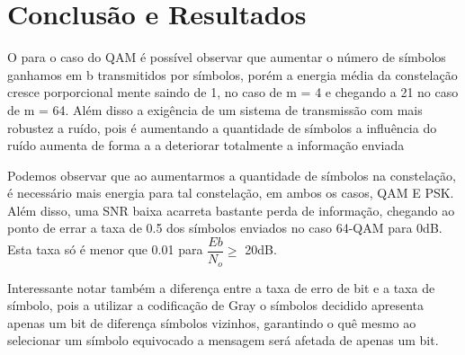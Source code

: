 \documentclass[a4paper, 12pt]{article}
\begin{document}





\clearpage

\clearpage

\clearpage

\clearpage

\clearpage

\section{Conclusão e Resultados}

O para o caso do QAM é possível observar que aumentar o número de símbolos ganhamos em b transmitidos por símbolos, porém a energia média da constelação cresce porporcional mente saindo de 1, no caso de m = 4 e chegando a 21 no caso de m = 64. Além disso a exigência de um sistema de transmissão com mais robustez a ruído, pois é aumentando a quantidade de símbolos a influência do ruído aumenta de forma a a deteriorar totalmente a informação enviada

Podemos observar que ao aumentarmos a quantidade de símbolos na constelação, é necessário mais energia para tal constelação, em ambos os casos, QAM E PSK. Além disso, uma SNR baixa acarreta bastante perda de informação, chegando ao ponto de errar a taxa de 0.5 dos símbolos enviados no caso 64-QAM para 0dB. Esta taxa só é menor que 0.01 para $\dfrac{Eb}{N_o} \geq $ 20dB.

Interessante notar também a diferença entre a taxa de erro de bit e a taxa de símbolo, pois a utilizar a codificação de Gray o símbolos decidido apresenta apenas um bit de diferença símbolos vizinhos, garantindo o quê mesmo ao selecionar um símbolo equivocado a mensagem será afetada de apenas um bit.


\clearpage

\printbibliography[heading=bibintoc]    %
\end{document}
